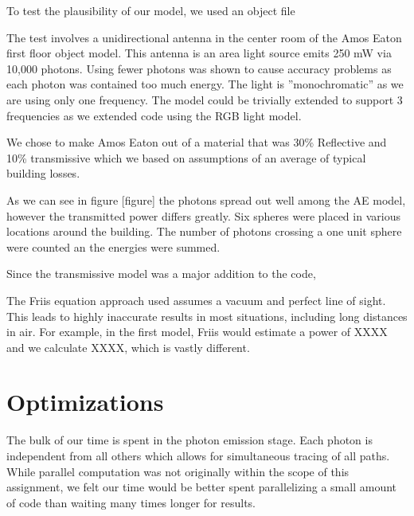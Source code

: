 \documentclass[%
        final,
        notitlepage,
        narroweqnarray,
        inline,
        twoside,
        ]{ieee}
\begin{document}
To test the plausibility of our model, we used an object file

The test involves a unidirectional antenna in the center room of the Amos Eaton
first floor object model. This antenna is an area light source emits 250 mW via 
10,000 photons. Using fewer photons was shown to cause accuracy problems as each
photon was contained too much energy. The light is ''monochromatic'' as we are 
using only one frequency. The model could be trivially extended to support 3 
frequencies as we extended code using the RGB light model.

We chose to make Amos Eaton out of a material that was 30\% Reflective and 10\%
transmissive which we based on assumptions of an average of typical building losses.

As we can see in figure [figure] the photons spread out well among the AE model, however
the transmitted power differs greatly. Six spheres were placed in various locations around
the building. The number of photons crossing a one unit sphere were counted an the energies
were summed.

Since the transmissive model was a major addition to the code, 



The Friis equation approach used assumes a vacuum and perfect line of sight.
This leads to highly inaccurate results in most situations, including long
distances in air. For example, in the first model, Friis would estimate a power of XXXX
and we calculate XXXX, which is vastly different. 



\section{Optimizations}
The bulk of our time is spent in the photon emission stage.  Each photon is
independent from all others which allows for simultaneous tracing of all
paths.  While parallel computation was not originally within the scope of this
assignment, we felt our time would be better spent parallelizing a small amount
of code than waiting many times longer for results.
\end{document}
